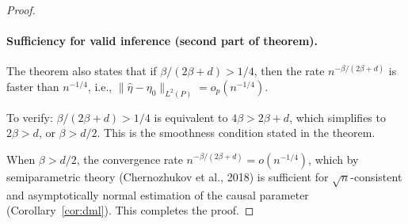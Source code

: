 \begin{proof}
\paragraph{Sufficiency for valid inference (second part of theorem).}
The theorem also states that if $\beta/(2\beta+d) > 1/4$, then the rate $n^{-\beta/(2\beta+d)}$ is faster than $n^{-1/4}$, i.e., $\|\hat\eta - \eta_0\|_{L^2(P)} = o_p(n^{-1/4})$.

To verify: $\beta/(2\beta+d) > 1/4$ is equivalent to $4\beta > 2\beta + d$, which simplifies to $2\beta > d$, or $\beta > d/2$. This is the smoothness condition stated in the theorem.

When $\beta > d/2$, the convergence rate $n^{-\beta/(2\beta+d)} = o(n^{-1/4})$, which by semiparametric theory (Chernozhukov et al., 2018) is sufficient for $\sqrt{n}$-consistent and asymptotically normal estimation of the causal parameter (Corollary~\ref{cor:dml}). This completes the proof.
\end{proof}
